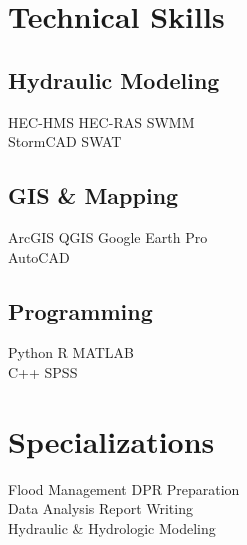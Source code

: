\documentclass[]{deedy-resume-openfont}
\begin{document}
\begin{minipage}[t]{0.33\textwidth}

\section{Technical Skills}
\subsection{Hydraulic Modeling}
HEC-HMS \textbullet{} HEC-RAS \textbullet{} SWMM \\
StormCAD \textbullet{} SWAT \\
\sectionsep

\subsection{GIS \& Mapping}
ArcGIS \textbullet{} QGIS \textbullet{} Google Earth Pro \\
AutoCAD \\
\sectionsep

\subsection{Programming}
Python \textbullet{} R \textbullet{} MATLAB \\
C++ \textbullet{} SPSS \\
\sectionsep


\section{Specializations}
Flood Management \textbullet{} DPR Preparation \\
Data Analysis \textbullet{} Report Writing \\
Hydraulic \& Hydrologic Modeling \\
\sectionsep

%
%

\end{minipage} 
\hfill
\end{document}
